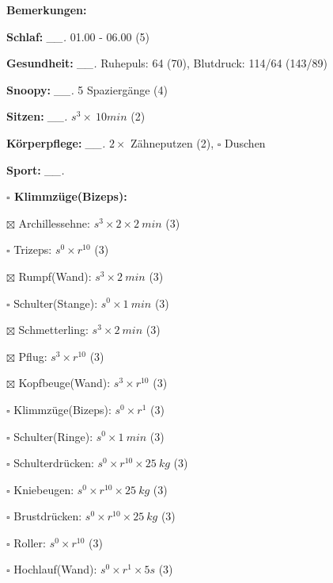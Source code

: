 \documentclass[10pt,a4paper]{article}
\newcommand\prop[1] {{\color {alizarin} {\bf #1}}}             %
\newcommand\mand[1] {{\color {burntorange} {\bf #1}}}          %
\newcommand\topspace{\vskip -15pt \hskip 20pt}
\newcommand\n[1] { {\sl #1.} \hskip 5pt }
\begin{document}
\begin{mdframed}[style=daystyle]
  \begin{labeling}{{\mand {Bemerkungen:}}}
    \setlength\itemsep{-3pt}
  \item[{\mand {Schlaf:}}]        \n{\_\_} 01.00 - 06.00 (5)
  \item[{\mand {Gesundheit:}}]    \n{\_\_} Ruhepuls: 64 (70), Blutdruck: 114/64 (143/89)
  \item[{\mand {Snoopy:}}]        \n{\_\_} 5 Spaziergänge (4)   
  \item[{\mand {Sitzen:}}]        \n{\_\_} $s^3 \times\ 10 min$ (2)
  \item[{\mand {Körperpflege:}}]  \n{\_\_} $2 \times$ Zähneputzen (2), $\square$ Duschen
  \item[{\mand {Sport:}}]         \n{\_\_}
    \topspace
    \begin{minipage}{0.75\textwidth}  
      \begin{labeling}{\prop {$\square$ {Klimmzüge(Bizeps):}}}
        \setlength\itemsep{-3pt}
      \item[$\boxtimes$ Archillessehne:]    $s^3 \times 2 \times 2\ min$ (3)
      \item[$\square$ Trizeps:]           $s^0 \times r^{10}$ (3)
      \item[$\boxtimes$ Rumpf(Wand):]       $s^3 \times 2\ min$ (3)
      \item[$\square$ Schulter(Stange):]  $s^0 \times 1\ min$ (3)
      \item[$\boxtimes$ Schmetterling:]     $s^3 \times 2\ min$ (3)
      \item[$\boxtimes$ Pflug:]             $s^3 \times r^{10}$ (3)
      \item[$\boxtimes$ Kopfbeuge(Wand):]   $s^3 \times r^{10}$ (3)
      \item[$\square$ Klimmzüge(Bizeps):] $s^0 \times r^1$ (3)
      \item[$\square$ Schulter(Ringe):]   $s^0 \times 1\ min$ (3)
      \item[$\square$ Schulterdrücken:]   $s^0 \times r^{10} \times 25\ kg$ (3)
      \item[$\square$ Kniebeugen:]        $s^0 \times r^{10} \times 25\ kg$ (3)
      \item[$\square$ Brustdrücken:]      $s^0 \times r^{10} \times 25\ kg$ (3)
      \item[$\square$ Roller:]            $s^0 \times r^{10}$ (3)
      \item[$\square$ Hochlauf(Wand):]    $s^0 \times r^{1} \times 5s$ (3)

\end{labeling}
\end{minipage}
\end{labeling}
\end{mdframed}
\end{document}
